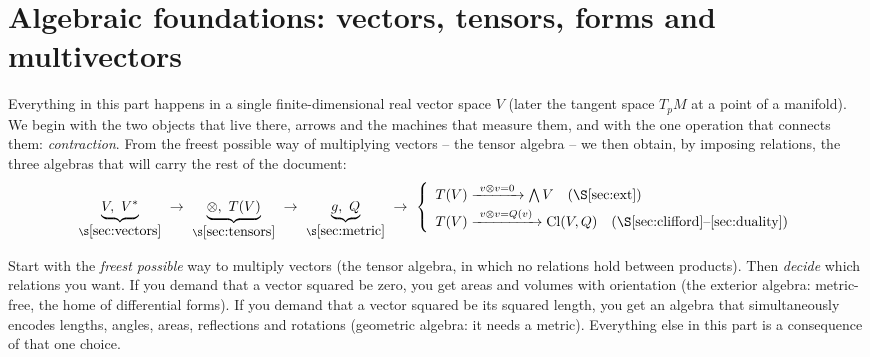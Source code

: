 \part{Algebraic foundations: vectors, tensors, forms and multivectors}\label{part:algebra}

Everything in this part happens in a single finite-dimensional real vector space $V$ (later the tangent space
$T_pM$ at a point of a manifold). We begin with the two objects that live there, arrows and the machines that
measure them, and with the one operation that connects them: \emph{contraction}. From the freest possible way of
multiplying vectors -- the tensor algebra -- we then obtain, by imposing relations, the three algebras that will carry the rest of the
document:
\[
\underbrace{V,\ V^*}_{\S\ref{sec:vectors}}\ \to\
\underbrace{\otimes,\ T(V)}_{\S\ref{sec:tensors}}\ \to\
\underbrace{g,\ Q}_{\S\ref{sec:metric}}\ \to\
\left\{\begin{array}{l}
 T(V)\xrightarrow{\ v\otimes v=0\ }\textstyle\bigwedge V\quad(\S\ref{sec:ext})\\[3pt]
 T(V)\xrightarrow{\ v\otimes v=Q(v)\ }\Cl(V,Q)\quad(\S\ref{sec:clifford}\text{--}\ref{sec:duality})
\end{array}\right.
\]

\begin{intuition}
Start with the \emph{freest possible} way to multiply vectors (the tensor algebra, in which no relations hold between
products). Then \emph{decide} which relations you want. If you demand that a vector squared be zero, you get areas and
volumes with orientation (the exterior algebra: metric-free, the home of differential forms). If you demand that a vector
squared be its squared length, you get an algebra that simultaneously encodes lengths, angles, areas, reflections and
rotations (geometric algebra: it needs a metric). Everything else in this part is a consequence of that one choice.
\end{intuition}
